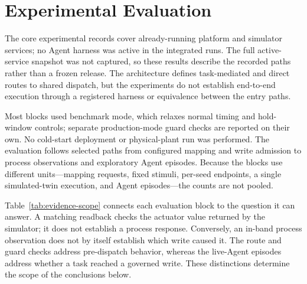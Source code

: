 \section{Experimental Evaluation}
\label{sec:eval}
The core experimental records cover already-running platform and simulator services; no Agent harness was active in the integrated runs. The full active-service snapshot was not captured, so these results describe the recorded paths rather than a frozen release. The architecture defines task-mediated and direct routes to shared dispatch, but the experiments do not establish end-to-end execution through a registered harness or equivalence between the entry paths.

Most blocks used benchmark mode, which relaxes normal timing and hold-window controls; separate production-mode guard checks are reported on their own. No cold-start deployment or physical-plant run was performed. The evaluation follows selected paths from configured mapping and write admission to process observations and exploratory Agent episodes. Because the blocks use different units—mapping requests, fixed stimuli, per-seed endpoints, a single simulated-twin execution, and Agent episodes—the counts are not pooled.

Table~\ref{tab:evidence-scope} connects each evaluation block to the question it can answer. A matching readback checks the actuator value returned by the simulator; it does not establish a process response. Conversely, an in-band process observation does not by itself establish which write caused it. The route and guard checks address pre-dispatch behavior, whereas the live-Agent episodes address whether a task reached a governed write. These distinctions determine the scope of the conclusions below.

